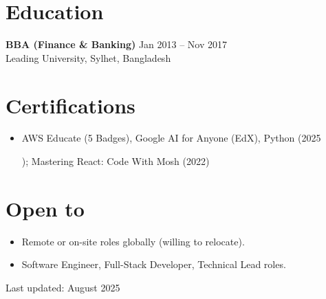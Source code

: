 \documentclass[a4paper,9pt]{article}
\begin{document}
\section*{Education}
\textbf{BBA (Finance \& Banking)} \hfill Jan 2013 – Nov 2017 \\
Leading University, Sylhet, Bangladesh

\section*{Certifications}
\begin{itemize}[leftmargin=*,itemsep=0.3pt]
    \item AWS Educate (5 Badges), Google AI for Anyone (EdX), Python (2025

    ); Mastering React: Code With Mosh (2022)
\end{itemize}

\section*{Open to}
\begin{itemize}[leftmargin=*,itemsep=0.3pt]
    \item Remote or on-site roles globally (willing to relocate).
    \item Software Engineer, Full-Stack Developer, Technical Lead roles.
\end{itemize}

\begin{center}
    \vspace{2mm}
    Last updated: August 2025
\end{center}
\end{document}
